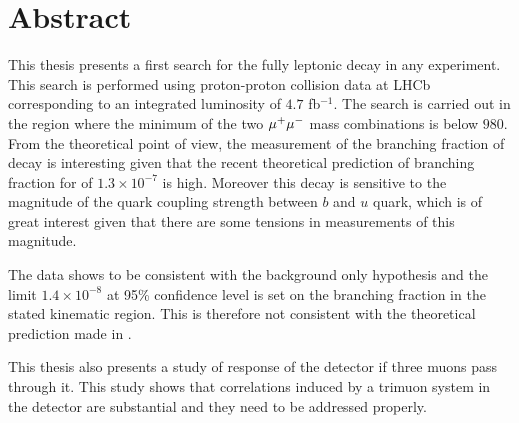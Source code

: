 \chapter*{Abstract}
\noindent
This thesis presents a first search for the fully leptonic decay \Bmumumu in any experiment. This search is performed using
proton-proton collision data at LHCb corresponding to an integrated luminosity of $4.7$ fb$^{-1}$. The search is carried out in the
region where the minimum of the two ${\mu^+\mu^-}$ mass combinations is below $980$\mevcc. From the theoretical point of view, the measurement of the branching fraction of decay is interesting given that the recent theoretical prediction \cite{Danilina:2018uzr} of branching fraction for \Bmumumu of $1.3 \times 10^{-7}$ is high. Moreover this decay is sensitive to the magnitude of the quark coupling strength between $b$ and $u$ quark, which is of great interest given that there are some tensions in measurements of this magnitude.

The data shows to be consistent with the background only hypothesis and the limit $1.4 \times 10^{-8}$ at 95\% confidence level is set on the branching fraction in the stated kinematic region. This is therefore not consistent with the theoretical prediction made in \cite{Danilina:2018uzr}.

This thesis also presents a study of response of the detector if three muons pass through it. This study shows that correlations induced by a trimuon system in the detector are substantial and they need to be addressed properly.



